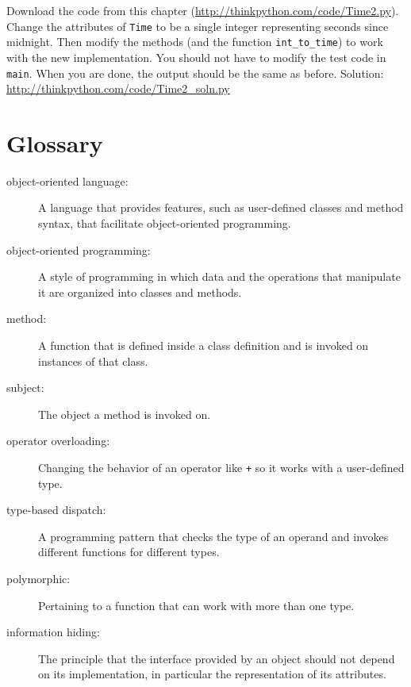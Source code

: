 \documentclass[10pt]{book}
\begin{document}
\begin{exercise}

Download the code from this chapter
(\url{http://thinkpython.com/code/Time2.py}).  Change the attributes
of {\tt Time} to be a single integer representing seconds since
midnight.  Then modify the methods (and the function
\verb"int_to_time") to work with the new implementation.  You should
not have to modify the test code in {\tt main}.  When you are done,
the output should be the same as before.  Solution:
\url{http://thinkpython.com/code/Time2_soln.py}

\end{exercise}


\section{Glossary}

\begin{description}

\item[object-oriented language:] A language that provides features,
  such as user-defined classes and method syntax, that facilitate
  object-oriented programming.

\item[object-oriented programming:] A style of programming in which
data and the operations that manipulate it are organized into classes
and methods.

\item[method:] A function that is defined inside a class definition and
is invoked on instances of that class.

\item[subject:] The object a method is invoked on.

\item[operator overloading:] Changing the behavior of an operator like
{\tt +} so it works with a user-defined type.

\item[type-based dispatch:] A programming pattern that checks the type
of an operand and invokes different functions for different types.

\item[polymorphic:] Pertaining to a function that can work with more
  than one type.  

\item[information hiding:] The principle that the interface provided 
by an object should not depend on its implementation, in particular
the representation of its attributes.


\end{description}
\end{document}
